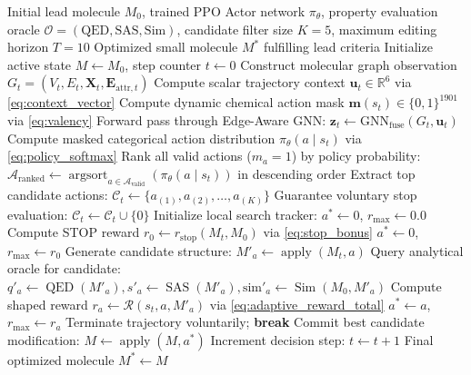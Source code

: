 \documentclass{ieeeaccess}
\begin{document}
\noindent\begin{minipage}{\columnwidth}
\begin{algorithm}[H]
\caption{PPO-Guided Local Search Hybrid (Top-$K$ Lookahead)}
\label{alg:ppo_hybrid}
\footnotesize
\begin{algorithmic}[1]
\REQUIRE Initial lead molecule $M_0$, trained PPO Actor network $\pi_\theta$, property evaluation oracle $\mathcal{O} = (\text{QED}, \text{SAS}, \text{Sim})$, candidate filter size $K=5$, maximum editing horizon $T=10$
\ENSURE Optimized small molecule $M^*$ fulfilling lead criteria
\STATE Initialize active state $M \leftarrow M_0$, step counter $t \leftarrow 0$
    \STATE Construct molecular graph observation $G_t = (V_t, E_t, \mathbf{X}_t, \mathbf{E}_{\text{attr}, t})$
    \STATE Compute scalar trajectory context $\mathbf{u}_t \in \mathbb{R}^6$ via \eqref{eq:context_vector}
    \STATE Compute dynamic chemical action mask $\mathbf{m}(s_t) \in \{0, 1\}^{1901}$ via \eqref{eq:valency}
    \STATE Forward pass through Edge-Aware GNN: $\mathbf{z}_t \leftarrow \text{GNN}_{\text{fuse}}(G_t, \mathbf{u}_t)$
    \STATE Compute masked categorical action distribution $\pi_\theta(a \mid s_t)$ via \eqref{eq:policy_softmax}
    \STATE Rank all valid actions ($m_a = 1$) by policy probability:
    \STATE $\mathcal{A}_{\text{ranked}} \leftarrow \operatorname{argsort}_{a \in \mathcal{A}_{\text{valid}}} \left( \pi_\theta(a \mid s_t) \right)$ in descending order
    \STATE Extract top candidate actions: $\mathcal{C}_t \leftarrow \{a_{(1)}, a_{(2)}, \dots, a_{(K)}\}$
    \STATE Guarantee voluntary stop evaluation: $\mathcal{C}_t \leftarrow \mathcal{C}_t \cup \{0\}$
    \STATE Initialize local search tracker: $a^* \leftarrow 0$, $r_{\max} \leftarrow 0.0$
            \STATE Compute STOP reward $r_0 \leftarrow r_{\text{stop}}(M_t, M_0)$ via \eqref{eq:stop_bonus}
                \STATE $a^* \leftarrow 0$, $r_{\max} \leftarrow r_0$
            \ENDIF
        \ELSE
            \STATE Generate candidate structure: $M'_a \leftarrow \operatorname{apply}(M_t, a)$
            \STATE Query analytical oracle for candidate: $q'_a \leftarrow \operatorname{QED}(M'_a), s'_a \leftarrow \operatorname{SAS}(M'_a), \text{sim}'_a \leftarrow \operatorname{Sim}(M_0, M'_a)$
            \STATE Compute shaped reward $r_a \leftarrow \mathcal{R}(s_t, a, M'_a)$ via \eqref{eq:adaptive_reward_total}
                \STATE $a^* \leftarrow a$, $r_{\max} \leftarrow r_a$
            \ENDIF
        \ENDIF
    \ENDFOR
        \STATE {}
        \STATE Terminate trajectory voluntarily; \textbf{break}
    \ENDIF
    \STATE Commit best candidate modification: $M \leftarrow \operatorname{apply}(M, a^*)$
    \STATE Increment decision step: $t \leftarrow t + 1$
\ENDWHILE
\RETURN Final optimized molecule $M^* \leftarrow M$
\end{algorithmic}
\end{algorithm}
\end{minipage}
\end{document}
